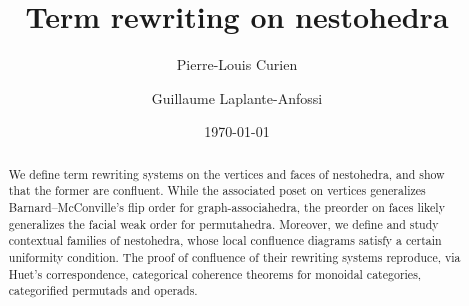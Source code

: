 \documentclass[11pt]{amsart}
\title{Term rewriting on nestohedra}
\author{Pierre-Louis Curien}
\author{Guillaume Laplante-Anfossi}
\date{\today}
\begin{document}
\begin{abstract}
We define term rewriting systems on the vertices and faces of nestohedra, and show that the former are confluent. 
While the associated poset on vertices generalizes Barnard--McConville's flip order for graph-associahedra, the preorder on faces likely generalizes the facial weak order for permutahedra. 
Moreover, we define and study contextual families of nestohedra, whose local confluence diagrams satisfy a certain uniformity condition. 
The proof of confluence of their rewriting systems reproduce, via Huet's correspondence, categorical coherence theorems for monoidal categories, categorified permutads and operads.
\end{abstract}

\maketitle

\setcounter{tocdepth}{1}





%

%
\bigskip





\end{document}
